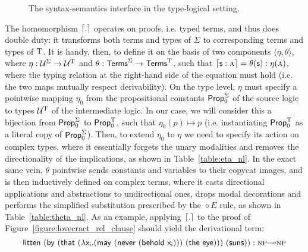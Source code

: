 \begin{figure}
	\centering
	\caption{The syntax-semantics interface in the type-logical setting.}
	\label{figure:synsemtlg}
\end{figure}

The homomorphism $\lceil{.}\rceil$ operates on proofs, i.e. typed terms, and thus does double duty: it transforms both terms and types of $\Sigma$ to corresponding terms and types of $\mathrm{T}$.
It is handy, then, to define it on the basis of two components $\langle \eta, \theta \rangle$, where $\eta : \mathcal{U}^{\Sigma} \to \mathcal{U}^{\mathrm{T}}$ and $\theta: \mathsf{Terms}^{\Sigma} \to \mathsf{Terms}^{\mathrm{T}}$, such that $\hm{\smallterm{s}: \smallprop{A}} = \theta({\smallterm{s}}) : \eta({\smallprop{A}})$, where the typing relation at the right-hand side of the equation must hold (i.e. the two maps mutually respect derivability).
On the type level, $\eta$ must specify a pointwise mapping $\eta_0$ from the propositional constants $\mathsf{Prop}_0^{\Sigma}$ of the source logic to types $\mathcal{U}^{\mathrm{T}}$ of the intermediate logic.
In our case, we will consider this a bijection from $\mathsf{Prop}_0^{\Sigma}$ to $\mathsf{Prop}_0^{\mathrm{T}}$, such that $\eta_0(p) \mapsto p$ (i.e. instantiating $\mathsf{Prop}_0^{\mathrm{T}}$ as a literal copy of $\mathsf{Prop}_0^{\Sigma}$).
Then, to extend $\eta_0$ to $\eta$ we need to specify its action on complex types, where it essentially forgets the unary modalities and removes the directionality of the implications, as shown in Table~\ref{table:eta_nl}.
In the exact same vein, $\theta$ pointwise sends constants and variables to their copycat images, and is then inductively defined on complex terms, where it casts directional applications and abstractions to undirectional ones, drops modal decorations and performs the simplified substitution prescribed by the $\diamond E$ rule, as shown in Table~\ref{table:theta_nl}.
As an example, applying $\lceil{.}\rceil$ to the proof of Figure~\ref{figure:lovecract_rel_clause} should yield the derivational term:
\begin{equation}\label{equation:litten_derterm}
\term{litten~(by~(that~(\lambda x_i .(may~(never~(behold~x_i )))~(the~eye)))~(suns))} : \prop{np}\li\prop{np}
\end{equation}


